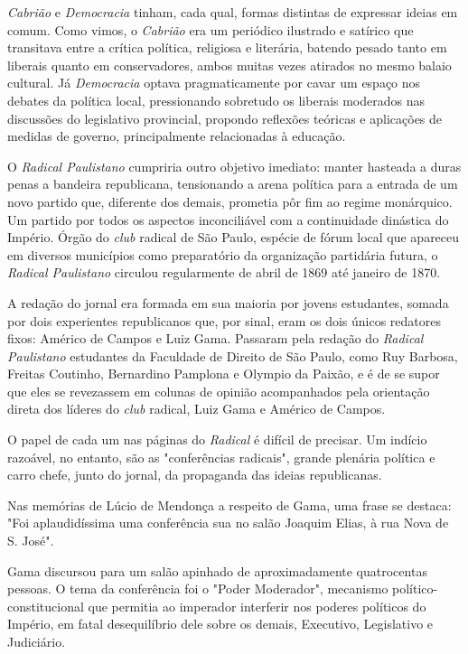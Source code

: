 \emph{Cabrião} e \emph{Democracia} tinham, cada qual, formas distintas
de expressar ideias em comum. Como vimos, o \emph{Cabrião} era um
periódico ilustrado e satírico que transitava entre a crítica política,
religiosa e literária, batendo pesado tanto em liberais quanto em
conservadores, ambos muitas vezes atirados no mesmo balaio cultural. Já
\emph{Democracia} optava pragmaticamente por cavar um espaço nos debates
da política local, pressionando sobretudo os liberais moderados nas
discussões do legislativo provincial, propondo reflexões teóricas e
aplicações de medidas de governo, principalmente relacionadas à
educação.

O \emph{Radical Paulistano} cumpriria outro objetivo imediato: manter
hasteada a duras penas a bandeira republicana, tensionando a arena
política para a entrada de um novo partido que, diferente dos demais,
prometia pôr fim ao regime monárquico. Um partido por todos os aspectos
inconciliável com a continuidade dinástica do Império. Órgão do
\emph{club} radical de São Paulo, espécie de fórum local que apareceu em
diversos municípios como preparatório da organização partidária futura,
o \emph{Radical Paulistano} circulou regularmente de abril de 1869 até
janeiro de 1870.

A redação do jornal era formada em sua maioria por jovens estudantes,
somada por dois experientes republicanos que, por sinal, eram os dois
únicos redatores fixos: Américo de Campos e Luiz Gama. Passaram pela
redação do \emph{Radical Paulistano} estudantes da Faculdade de Direito
de São Paulo, como Ruy Barbosa, Freitas Coutinho, Bernardino Pamplona e
Olympio da Paixão, e é de se supor que eles se revezassem em colunas de
opinião acompanhados pela orientação direta dos líderes do \emph{club}
radical, Luiz Gama e Américo de Campos.

O papel de cada um nas páginas do \emph{Radical} é difícil de precisar.
Um indício razoável, no entanto, são as "conferências radicais", grande
plenária política e carro chefe, junto do jornal, da propaganda das
ideias republicanas.

Nas memórias de Lúcio de Mendonça a respeito de Gama, uma frase se
destaca: "Foi aplaudidíssima uma conferência sua no salão Joaquim Elias,
à rua Nova de S. José".

Gama discursou para um salão apinhado de aproximadamente quatrocentas
pessoas. O tema da conferência foi o "Poder Moderador", mecanismo
político-constitucional que permitia ao imperador interferir nos poderes
políticos do Império, em fatal desequilíbrio dele sobre os demais,
Executivo, Legislativo e Judiciário.


